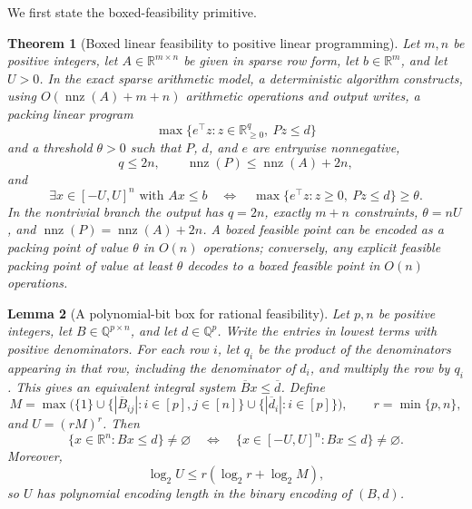 \documentclass[11pt]{article}
\newtheorem{theorem}{Theorem}[section]
\newtheorem{lemma}[theorem]{Lemma}
\theoremstyle{remark}
\newcommand{\R}{\mathbb{R}}
\newcommand{\nnz}{\operatorname{nnz}}
\begin{document}
We first state the boxed-feasibility primitive.

\begin{theorem}[Boxed linear feasibility to positive linear programming]
\label{thm:main}
Let $m,n$ be positive integers, let $A\in\R^{m\times n}$ be given in
sparse row form, let $b\in\R^m$, and let $U>0$.  In the exact sparse
arithmetic model, a deterministic algorithm constructs, using
$O(\nnz(A)+m+n)$ arithmetic operations and output writes, a packing
linear program
\[
  \max\{e^\top z:z\in\R_{\geq0}^{q},\ Pz\leq d\}
\]
and a threshold $\theta>0$ such that $P$, $d$, and $e$ are entrywise
nonnegative,
\[
  q\leq2n,\qquad \nnz(P)\leq\nnz(A)+2n,
\]
and
\[
  \exists x\in[-U,U]^n\text{ with }Ax\leq b
  \quad\Longleftrightarrow\quad
  \max\{e^\top z:z\geq0,\ Pz\leq d\}\geq\theta.
\]
In the nontrivial branch the output has $q=2n$, exactly $m+n$
constraints, $\theta=nU$, and
$\nnz(P)=\nnz(A)+2n$.  A boxed feasible point can be encoded as a
packing point of value $\theta$ in $O(n)$ operations; conversely, any
explicit feasible packing point of value at least $\theta$ decodes to
a boxed feasible point in $O(n)$ operations.
\end{theorem}

\begin{lemma}[A polynomial-bit box for rational feasibility]
\label{lem:rational-box}
Let $p,n$ be positive integers, let $B\in\mathbb{Q}^{p\times n}$, and
let $d\in\mathbb{Q}^p$.  Write the entries in lowest terms with positive
denominators.  For each row $i$, let $q_i$ be the product of the
denominators appearing in that row, including the denominator of $d_i$,
and multiply the row by $q_i$.  This gives an equivalent integral system
$\overline Bx\leq\overline d$.  Define
\[
  M=\max\bigl(\{1\}\cup
  \{|\overline B_{ij}|:i\in[p],j\in[n]\}\cup
  \{|\overline d_i|:i\in[p]\}\bigr),
  \qquad
  r=\min\{p,n\},
\]
and $U=(rM)^r$.  Then
\[
  \{x\in\R^n:Bx\leq d\}\neq\varnothing
  \quad\Longleftrightarrow\quad
  \{x\in[-U,U]^n:Bx\leq d\}\neq\varnothing.
\]
Moreover,
\[
  \log_2 U\leq r(\log_2 r+\log_2 M),
\]
so $U$ has polynomial encoding length in the binary encoding of
$(B,d)$.
\end{lemma}
\end{document}
